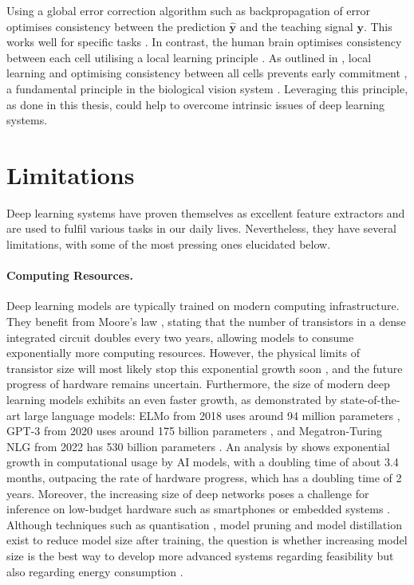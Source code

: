 Using a global error correction algorithm such as backpropagation of error optimises consistency between the prediction $\boldsymbol{\hat{y}}$ and the teaching signal $\boldsymbol{y}$.
This works well for specific tasks .
In contrast, the human brain optimises consistency between each cell utilising a local learning principle . 
As outlined in , local learning and optimising consistency between all cells prevents early commitment , a fundamental principle in the biological vision system .
Leveraging this principle, as done in this thesis, could help to overcome intrinsic issues of deep learning systems.

\section{Limitations}
Deep learning systems have proven themselves as excellent feature extractors and are used to fulfil various tasks in our daily lives.
Nevertheless, they have several limitations, with some of the most pressing ones elucidated below.

\paragraph{Computing Resources.} Deep learning models are typically trained on modern computing infrastructure. They benefit from Moore's law , stating that the number of transistors in a dense integrated circuit doubles every two years, allowing models to consume exponentially more computing resources. However, the physical limits of transistor size will most likely stop this exponential growth soon , and the future progress of hardware remains uncertain.
Furthermore, the size of modern deep learning models exhibits an even faster growth, as demonstrated by state-of-the-art large language models: 
ELMo from 2018 uses around 94 million parameters , 
GPT-3 from 2020 uses around 175 billion parameters , and Megatron-Turing NLG from 2022 has 530 billion parameters \cite{smith_using_2022}.
An analysis by  shows exponential growth in computational usage by AI models, with a doubling time of about 3.4 months, outpacing the rate of hardware progress, which has a doubling time of 2 years. Moreover, the increasing size of deep networks poses a challenge for inference on low-budget hardware such as smartphones or embedded systems . Although techniques such as quantisation , model pruning  and model distillation  exist to reduce model size after training, the question is whether increasing model size is the best way to develop more advanced systems regarding feasibility but also regarding energy consumption .


